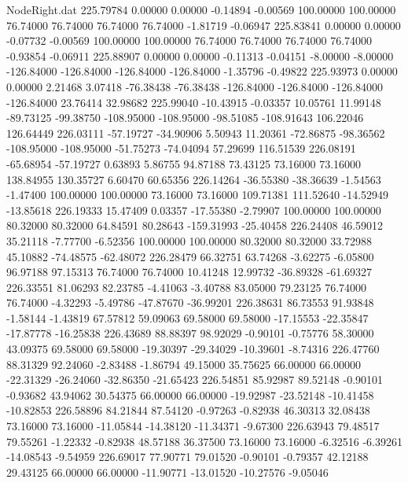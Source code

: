 \begin{filecontents}{NodeRight.dat}
 225.79784    0.00000    0.00000    -0.14894   -0.00569  100.00000  100.00000   76.74000   76.74000   76.74000   76.74000   -1.81719   -0.06947
 225.83841    0.00000    0.00000    -0.07732   -0.00569  100.00000  100.00000   76.74000   76.74000   76.74000   76.74000   -0.93854   -0.06911
 225.88907    0.00000    0.00000    -0.11313   -0.04151   -8.00000   -8.00000 -126.84000 -126.84000 -126.84000 -126.84000   -1.35796   -0.49822
 225.93973    0.00000    0.00000     2.21468    3.07418  -76.38438  -76.38438 -126.84000 -126.84000 -126.84000 -126.84000   23.76414   32.98682
 225.99040  -10.43915   -0.03357    10.05761   11.99148  -89.73125  -99.38750 -108.95000 -108.95000  -98.51085 -108.91643  106.22046  126.64449
 226.03111  -57.19727  -34.90906     5.50943   11.20361  -72.86875  -98.36562 -108.95000 -108.95000  -51.75273  -74.04094   57.29699  116.51539
 226.08191  -65.68954  -57.19727     0.63893    5.86755   94.87188   73.43125   73.16000   73.16000  138.84955  130.35727    6.60470   60.65356
 226.14264  -36.55380  -38.36639    -1.54563   -1.47400  100.00000  100.00000   73.16000   73.16000  109.71381  111.52640  -14.52949  -13.85618
 226.19333   15.47409    0.03357   -17.55380   -2.79907  100.00000  100.00000   80.32000   80.32000   64.84591   80.28643 -159.31993  -25.40458
 226.24408   46.59012   35.21118    -7.77700   -6.52356  100.00000  100.00000   80.32000   80.32000   33.72988   45.10882  -74.48575  -62.48072
 226.28479   66.32751   63.74268    -3.62275   -6.05800   96.97188   97.15313   76.74000   76.74000   10.41248   12.99732  -36.89328  -61.69327
 226.33551   81.06293   82.23785    -4.41063   -3.40788   83.05000   79.23125   76.74000   76.74000   -4.32293   -5.49786  -47.87670  -36.99201
 226.38631   86.73553   91.93848    -1.58144   -1.43819   67.57812   59.09063   69.58000   69.58000  -17.15553  -22.35847  -17.87778  -16.25838
 226.43689   88.88397   98.92029    -0.90101   -0.75776   58.30000   43.09375   69.58000   69.58000  -19.30397  -29.34029  -10.39601   -8.74316
 226.47760   88.31329   92.24060    -2.83488   -1.86794   49.15000   35.75625   66.00000   66.00000  -22.31329  -26.24060  -32.86350  -21.65423
 226.54851   85.92987   89.52148    -0.90101   -0.93682   43.94062   30.54375   66.00000   66.00000  -19.92987  -23.52148  -10.41458  -10.82853
 226.58896   84.21844   87.54120    -0.97263   -0.82938   46.30313   32.08438   73.16000   73.16000  -11.05844  -14.38120  -11.34371   -9.67300
 226.63943   79.48517   79.55261    -1.22332   -0.82938   48.57188   36.37500   73.16000   73.16000   -6.32516   -6.39261  -14.08543   -9.54959
 226.69017   77.90771   79.01520    -0.90101   -0.79357   42.12188   29.43125   66.00000   66.00000  -11.90771  -13.01520  -10.27576   -9.05046

\end{filecontents}
